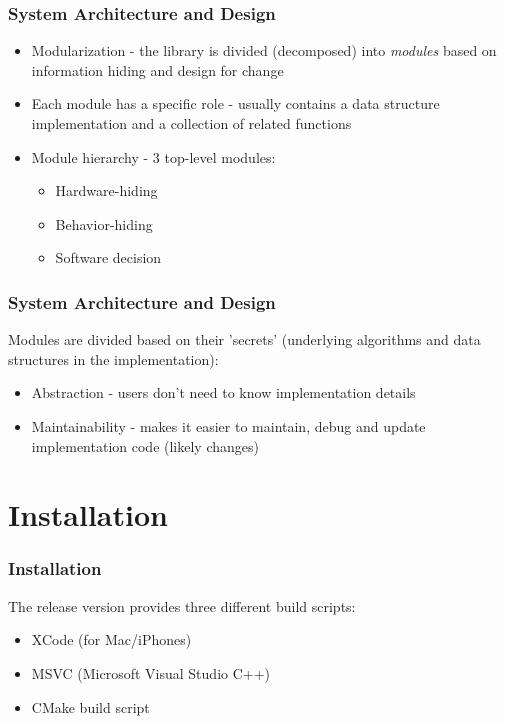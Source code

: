 \documentclass{beamer}
\begin{document}
\begin{frame}

\frametitle{System Architecture and Design}

\begin{itemize}
	\item Modularization - the library is divided (decomposed) into \textit{modules} based on information hiding and design for change
	\item Each module has a specific role - usually contains a data structure implementation and a collection of related functions
	\item Module hierarchy - 3 top-level modules:
		\begin{itemize}
			\item Hardware-hiding
			\item Behavior-hiding
			\item Software decision
		\end{itemize}
\end{itemize}

\end{frame}


\begin{frame}
	
\frametitle{System Architecture and Design}

Modules are divided based on their 'secrets' (underlying algorithms and data structures in the implementation):

\begin{itemize}
	\item Abstraction - users don't need to know implementation details
	\item Maintainability - makes it easier to maintain, debug and update implementation code (likely changes)
\end{itemize}

\end{frame}


\section[Installation]{Installation}


\begin{frame}

\frametitle{Installation}

The release version provides three different build scripts:

\begin{itemize}
	\item XCode (for Mac/iPhones)
	\item MSVC (Microsoft Visual Studio C++)
	\item CMake build script
\end{itemize}

\end{frame}
\end{document}
